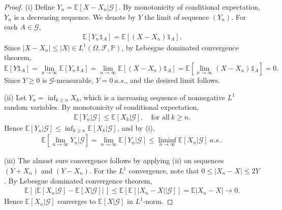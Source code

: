 \documentclass{article}
\numberwithin{equation}{section}
\newcommand{\E}{\mathbb{E}}
\renewcommand{\P}{\mathbb{P}}
\newcommand{\scr}{\mathscr}
\theoremstyle{plain}
\theoremstyle{definition}
\begin{document}
\begin{proof}
(i) Define $Y_n=\E[X-X_n|\scr{G}]$. By monotonicity of conditional expectation, $Y_n$ is a decreasing sequence. We denote by $Y$ the limit of sequence $(Y_n)$. For each $A\in\scr{G}$, 
\begin{align*}
	\E[Y_n\mathds{1}_A]=\E[(X-X_n)\mathds{1}_A].
\end{align*}
Since $\vert X-X_n\vert\leq\vert X\vert\in L^1(\Omega,\scr{F},\P)$, by Lebesgue dominated convergence theorem,  $$\E[Y\mathds{1}_A]=\lim_{n\to\infty}\E[Y_n\mathds{1}_A]=\lim_{n\to\infty}\E[(X-X_n)\mathds{1}_A]=\E\left[\lim_{n\to\infty}(X-X_n)\mathds{1}_A\right]=0.$$
Since $Y\geq 0$ is $\scr{G}$-measurable, $Y=0\ a.s.$, and the desired limit follows.

(ii) Let $Y_n=\inf_{k\geq n}X_k$, which is a increasing sequence of nonnegative $L^1$ random variables. By monotonicity of conditional expectation,\vspace{-0.1cm}
\begin{align*}
	\E[Y_n|\scr{G}]\leq\E[X_k|\scr{G}],\quad\text{for all}\ k\geq n.
\end{align*}
Hence $\E[Y_n|\scr{G}]\leq\inf_{k\geq n}\E[X_k|\scr{G}]$, and by (i),
\begin{align*}
	\E\left[\lim_{n\to\infty} Y_n\big|\scr{G}\right]=\lim_{n\to\infty}\E\left[Y_n|\scr{G}\right]\leq\liminf_{n\to\infty}\E[X_n|\scr{G}]\ a.s..
\end{align*} 
	
(iii) The almost sure convergence follows by applying (ii) on sequences $(Y+X_n)$ and $(Y-X_n)$. For the $L^1$ convergence, note that $0\leq\vert X_n-X\vert\leq 2Y$. By Lebesgue dominated convergence theorem, 
\begin{align*}
	\E\left[\,\left\vert\E[X_n|\mathscr{G}]-\E[X|\mathscr{G}]\right\vert\,\right]\leq \E\left[\E[\left\vert X_n-X\right\vert|\mathscr{G}]\right] = \E\left\vert X_n-X\right\vert\to 0.
\end{align*}
Hence $\E[X_n|\mathscr{G}]$ converges to $\E[X|\mathscr{G}]$ in $L^1$-norm.
\end{proof}
\end{document}
